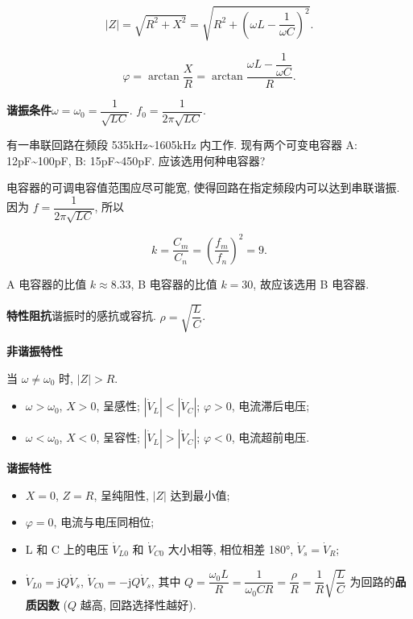 \begin{equation}
    |Z|=\sqrt{R^2+X^2}=\sqrt{R^2+\left(\omega L-\frac{1}{\omega C}\right)^2}.
\end{equation}

\begin{equation}
    \varphi=\arctan\frac{X}{R}=\arctan\frac{\omega L-\dfrac{1}{\omega C}}{R}.
\end{equation}

\textbf{谐振条件}\quad $\omega=\omega_0=\dfrac{1}{\sqrt{LC}}$. $f_0=\dfrac{1}{2\pi\sqrt{LC}}$.

\begin{exampleprob}
    有一串联回路在频段 535kHz\textasciitilde 1605kHz 内工作. 现有两个可变电容器 A: 12pF\textasciitilde 100pF, B: 15pF\textasciitilde 450pF. 应该选用何种电容器?

    \begin{solution}
        电容器的可调电容值范围应尽可能宽, 使得回路在指定频段内可以达到串联谐振. 因为 $f=\dfrac{1}{2\pi\sqrt{LC}}$, 所以

        \begin{equation*}
            k=\frac{C_m}{C_n}=\left(\frac{f_m}{f_n}\right)^2=9.
        \end{equation*}

        A 电容器的比值 $k\approx 8.33$, B 电容器的比值 $k=30$, 故应该选用 B 电容器.
    \end{solution}
\end{exampleprob}

\textbf{特性阻抗}\quad 谐振时的感抗或容抗. $\rho=\sqrt{\dfrac{L}{C}}$.

\textbf{非谐振特性}

当 $\omega\neq\omega_0$ 时, $|Z|>R$.

\begin{itemize}
    \item $\omega>\omega_0$, $X>0$, 呈感性; $|\dot{V}_L|<|\dot{V}_C|$; $\varphi>0$, 电流滞后电压;
    \item $\omega<\omega_0$, $X<0$, 呈容性; $|\dot{V}_L|>|\dot{V}_C|$; $\varphi<0$, 电流超前电压.
\end{itemize}

\textbf{谐振特性}

\begin{itemize}
    \item $X=0$, $Z=R$, 呈纯阻性, $|Z|$ 达到最小值;
    \item $\varphi=0$, 电流与电压同相位;
    \item L 和 C 上的电压 $\dot{V}_{L0}$ 和 $\dot{V}_{C0}$ 大小相等, 相位相差 180°, $\dot{V}_s=\dot{V}_R$;
    \item $\dot{V}_{L0}=\mathrm{j}Q\dot{V}_s$, $\dot{V}_{C0}=-\mathrm{j}Q\dot{V}_s$, 其中 $Q=\dfrac{\omega_0L}{R}=\dfrac{1}{\omega_0CR}=\dfrac{\rho}{R}=\dfrac{1}{R}\sqrt{\dfrac{L}{C}}$ 为回路的\textbf{品质因数} ($Q$ 越高, 回路选择性越好).
\end{itemize}

